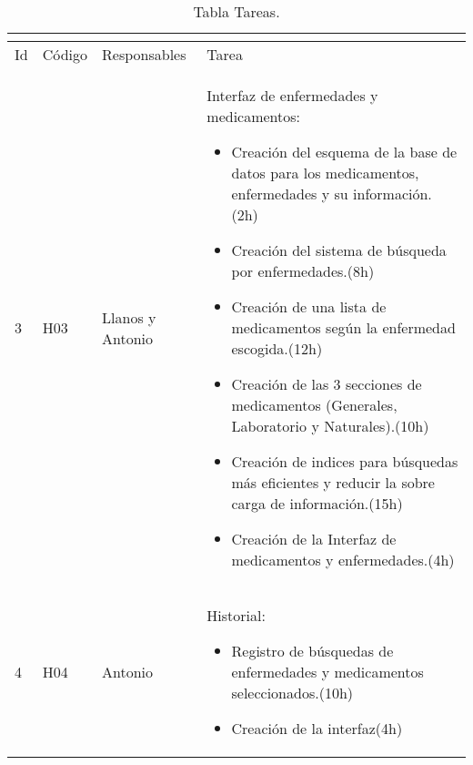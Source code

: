 
\begin{table}[htb]
\centering
\begin{tabular}{|l|p{1.5cm}|p{2.5cm}|p{10cm}|}
	\hline
	\multicolumn{4}{|c|}{} \\ \hline
	Id & Código & Responsables & Tarea \\
	\hline \hline

		3 & H03 & Llanos y Antonio & Interfaz de enfermedades y medicamentos: 
	
	\begin{itemize}
		\item Creación del esquema de la base de datos para los medicamentos, enfermedades y su información.(2h)
		\item Creación del sistema de búsqueda por enfermedades.(8h)
		\item Creación de una lista de medicamentos según la enfermedad escogida.(12h)
		\item Creación de las 3 secciones de medicamentos (Generales, Laboratorio y Naturales).(10h)
		\item Creación de indices para búsquedas más eficientes y reducir la sobre carga de información.(15h)
		\item Creación de la Interfaz de medicamentos y enfermedades.(4h)
	\end{itemize}\\ \hline
	
	4 & H04 & Antonio & Historial:
	\begin{itemize}
		\item Registro de búsquedas de enfermedades y medicamentos seleccionados.(10h)
		\item Creación de la interfaz(4h)
	\end{itemize}\\ \hline
	
	
\end{tabular}
\caption{Tabla Tareas.}
\label{tabla:Tareas2}
\end{table}